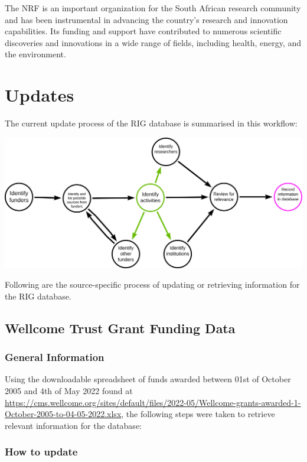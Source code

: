 \documentclass[
]{book}
\begin{document}
The NRF is an important organization for the South African research community and has been instrumental in advancing the country's research and innovation capabilities. Its funding and support have contributed to numerous scientific discoveries and innovations in a wide range of fields, including health, energy, and the environment.

\hypertarget{updates}{%
\chapter{Updates}\label{updates}}

The current update process of the RIG database is summarised in this workflow:

\includegraphics{images/initial-acdc-db-search_NK.png}

Following are the source-specific process of updating or retrieving information for the RIG database.

\hypertarget{update-wellcome}{%
\section{Wellcome Trust Grant Funding Data}\label{update-wellcome}}

\hypertarget{general-information}{%
\subsection{General Information}\label{general-information}}

Using the downloadable spreadsheet of funds awarded between 01st of October 2005 and 4th of May 2022 found at \url{https://cms.wellcome.org/sites/default/files/2022-05/Wellcome-grants-awarded-1-October-2005-to-04-05-2022.xlsx}, the following steps were taken to retrieve relevant information for the database:

\hypertarget{how-to-update}{%
\subsection{How to update}\label{how-to-update}}
\end{document}
